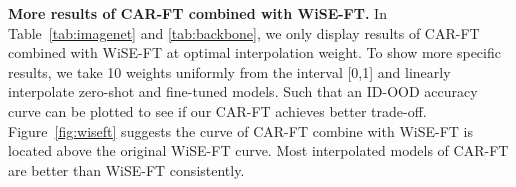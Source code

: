 \documentclass[pdflatex,sn-basic,iicol]{sn-jnl}
\theoremstyle{thmstyleone}\newtheorem{theorem}{Theorem}\newtheorem{proposition}[theorem]{Proposition}
\theoremstyle{thmstyletwo}\newtheorem{example}{Example}\newtheorem{remark}{Remark}
\theoremstyle{thmstylethree}\newtheorem{definition}{Definition}
\begin{document}
\noindent\textbf{More results of CAR-FT combined with WiSE-FT.} In Table~\ref{tab:imagenet} and \ref{tab:backbone}, we only display results of CAR-FT combined with WiSE-FT at optimal interpolation weight. To show more specific results, we take 10 weights uniformly from the interval [0,1] and linearly interpolate zero-shot and fine-tuned models. Such that an ID-OOD accuracy curve can be plotted to see if our CAR-FT achieves better trade-off. Figure~\ref{fig:wiseft} suggests the curve of CAR-FT combine with WiSE-FT is located above the original WiSE-FT curve. Most interpolated models of CAR-FT are better than WiSE-FT consistently. 


























































































\end{document}
